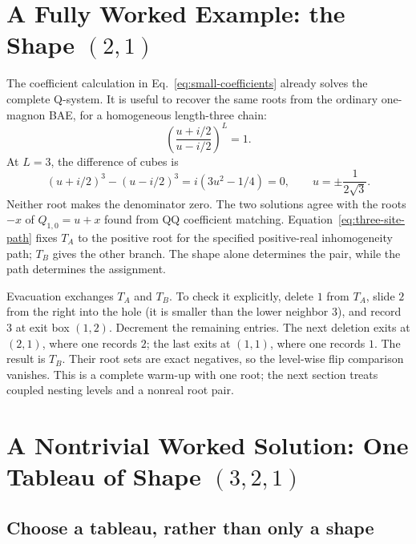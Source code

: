 \documentclass[11pt]{article}
\begin{document}
\section{A Fully Worked Example: the Shape \texorpdfstring{$(2,1)$}{(2,1)}}
\label{sec:worked-example}

The coefficient calculation in Eq.~\eqref{eq:small-coefficients} already
solves the complete Q-system. It is useful to recover the same roots from
the ordinary one-magnon BAE, for a homogeneous length-three chain:
\begin{equation}
 \label{eq:one-magnon}
 \left(\frac{u+i/2}{u-i/2}\right)^L=1.
\end{equation}
At $L=3$, the difference of cubes is
\begin{equation}
 \label{eq:one-magnon-quadratic}
 (u+i/2)^3-(u-i/2)^3=i(3u^2-1/4)=0,
 \qquad u=\pm\frac1{2\sqrt3}.
\end{equation}
Neither root makes the denominator zero. The two solutions agree with
the roots $-x$ of $Q_{1,0}=u+x$ found from QQ coefficient matching.
Equation~\eqref{eq:three-site-path} fixes $T_A$ to the positive root for
the specified positive-real inhomogeneity path; $T_B$ gives the other
branch. The shape alone determines the pair, while the path determines
the assignment.

Evacuation exchanges $T_A$ and $T_B$. To check it explicitly, delete $1$
from $T_A$, slide $2$ from the right into the hole (it is smaller than
the lower neighbor $3$), and record $3$ at exit box $(1,2)$. Decrement
the remaining entries. The next deletion exits at $(2,1)$, where one
records $2$; the last exits at $(1,1)$, where one records $1$. The result
is $T_B$. Their root sets are exact negatives, so the level-wise flip
comparison vanishes. This is a complete warm-up with one root; the next
section treats coupled nesting levels and a nonreal root pair.

\section{A Nontrivial Worked Solution: One Tableau of Shape
\texorpdfstring{$(3,2,1)$}{(3,2,1)}}
\label{sec:worked-321}

\subsection{Choose a tableau, rather than only a shape}
\end{document}
